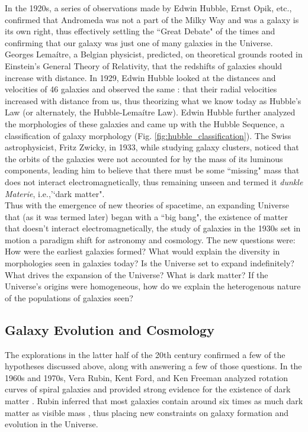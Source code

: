 In the 1920s, a series of observations made by Edwin Hubble, Ernst Opik, etc., confirmed that Andromeda was not a part of the Milky Way and was a galaxy is its own right, thus effectively settling the ``Great Debate" of the times and confirming that our galaxy was just one of many galaxies in the Universe. Georges Lema{\'i}tre, a Belgian physicist, predicted, on theoretical grounds rooted in Einstein's General Theory of Relativity, that the redshifts of galaxies should increase with distance. In 1929, Edwin Hubble looked at the distances and velocities of 46 galaxies and observed the same \citep{1929PNAS...15..168H}: that their radial velocities increased with distance from us, thus theorizing what we know today as Hubble's Law (or alternately, the Hubble-Lema{\'i}tre Law). Edwin Hubble further analyzed the morphologies of these galaxies and came up with the Hubble Sequence, a classification of galaxy morphology (Fig. \ref{fig:hubble_classification}). The Swiss astrophysicist, Fritz Zwicky, in 1933, while studying galaxy clusters, noticed that the orbits of the galaxies were not accounted for by the mass of its luminous components, leading him to believe that there must be some ``missing" mass \citep{1937ApJ....86..217Z} that does not interact electromagnetically, thus remaining unseen and termed it \emph{dunkle Materie}, i.e.,'`dark matter".\\

Thus with the emergence of new theories of spacetime, an expanding Universe that (as it was termed later) began with a ``big bang", the existence of matter that doesn't interact electromagnetically, the study of galaxies in the 1930s set in motion a paradigm shift for astronomy and cosmology. The new questions were: How were the earliest galaxies formed? What would explain the diversity in morphologies seen in galaxies today? Is the Universe set to expand indefinitely? What drives the expansion of the Universe? What is dark matter? If the Universe's origins were homogeneous, how do we explain the heterogenous nature of the populations of galaxies seen?\\

\subsection{Galaxy Evolution and Cosmology}

The explorations in the latter half of the 20th century confirmed a few of the hypotheses discussed above, along with answering a few of those questions. In the 1960s and 1970s, Vera Rubin, Kent Ford, and Ken Freeman analyzed rotation curves of spiral galaxies and provided strong evidence for the existence of dark matter \citep{freeman_disks_1970-1}. Rubin inferred that most galaxies contain around six times as much dark matter as visible mass \citep{rubin_rotational_1980}, thus placing new constraints on galaxy formation and evolution in the Universe.\\

